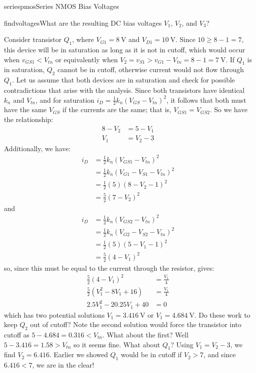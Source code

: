 \begin{mainquestion}{seriespmos}{Series NMOS Bias Voltages}
\begin{partquestion}{findvoltages}{What are the resulting DC bias voltages $V_{1}$, $V_{2}$, and $V_{3}$?}
\begin{answer}
Consider transistor $Q_{1}$, where $V_{G1} = \qty{8}{\volt}$ and $V_{D1} = \qty{10}{\volt}$. Since $10 \geq 8 - 1 = 7$, this device will be in saturation as long as it is not in cutoff, which would occur when $v_{GS1} < V_{tn}$ or equivalently when $V_{2} = v_{S1} > v_{G1} - V_{tn} = 8 - 1 = \qty{7}{\volt}$. If $Q_{1}$ is in saturation, $Q_{2}$ cannot be in cutoff, otherwise current would not flow through $Q_{1}$. Let us assume that both devices are in saturation and check for possible contradictions that arise with the analysis. Since both transistors have identical $k_{n}$ and $V_{tn}$, and for saturation $i_{D} = \frac{1}{2}k_{n}\left(V_{GS} - V_{tn} \right)^{2}$, it follows that both must have the same $V_{GS}$ if the currents are the same; that is, $V_{GS1} = V_{GS2}$. So we have the relationship:
\begin{align*}
    8 - V_2 &= 5 - V_1 \\
    V_1 &= V_2 - 3
\end{align*}
Additionally, we have:
\begin{align*}
    i_D &= \frac{1}{2} k_n (V_{GS1} - V_{tn})^2 \\
    &= \frac{1}{2} k_n (V_{G1} - V_{S1} - V_{tn})^2 \\
    &= \frac{1}{2} (5) (8 - V_2 - 1)^2 \\
    &= \frac{5}{2} (7 - V_2)^2
\end{align*}
and
\begin{align*}
    i_D &= \frac{1}{2} k_n (V_{GS2} - V_{tn})^2 \\
    &= \frac{1}{2} k_n (V_{G2} - V_{S2} - V_{tn})^2 \\
    &= \frac{1}{2} (5) (5 - V_1 - 1)^2 \\
    &= \frac{5}{2} (4 - V_1)^2
\end{align*}
so, since this must be equal to the current through the resistor, gives:
\begin{align*}
    \frac{5}{2} (4 - V_1)^2 &= \frac{V_1}{4} \\
    \frac{5}{2} (V_1^2 - 8V_1 +16) &= \frac{V_1}{4} \\
    2.5V_1^2 - 20.25V_1 + 40 &= 0
\end{align*}
which has two potential solutions $V_{1} = \qty{3.416}{\volt}$ or $V_{1} = \qty{4.684}{\volt}$. Do these work to keep $Q_2$ out of cutoff? Note the second solution would force the transistor into cutoff as $5 - 4.684 = 0.316 < V_{tn}$. What about the first? Well $5 - 3.416 = 1.58 > V_{tn}$ so it seems fine. What about $Q_1$? Using $V_1 = V_2 - 3$, we find $V_2 = 6.416$. Earlier we showed $Q_1$ would be in cutoff if $V_2 > 7$, and since $6.416 < 7$, we are in the clear!


\end{answer}
\end{partquestion}
\end{mainquestion}

